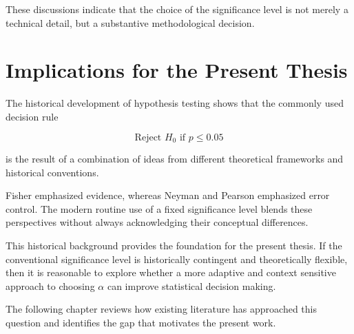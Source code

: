 These discussions indicate that the choice of the significance level is not merely a technical detail, but a substantive methodological decision.


\section{Implications for the Present Thesis}

The historical development of hypothesis testing shows that the commonly used decision rule

\begin{equation}
	\text{Reject } H_0 \text{ if } p \leq 0.05
\end{equation}

is the result of a combination of ideas from different theoretical frameworks and historical conventions.

Fisher emphasized evidence, whereas Neyman and Pearson emphasized error control. The modern routine use of a fixed significance level blends these perspectives without always acknowledging their conceptual differences.

This historical background provides the foundation for the present thesis. If the conventional significance level is historically contingent and theoretically flexible, then it is reasonable to explore whether a more adaptive and context sensitive approach to choosing $\alpha$ can improve statistical decision making.

The following chapter reviews how existing literature has approached 
this question and identifies the gap that motivates the present work.

